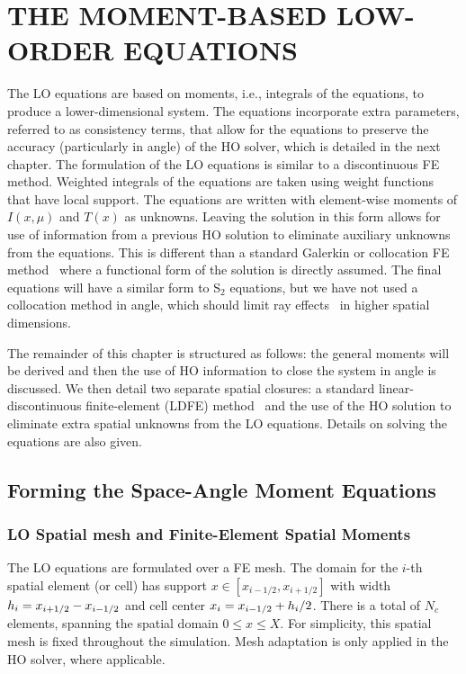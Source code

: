 
\chapter{\uppercase{The Moment-Based Low-Order Equations}}
\label{chp:lo}

The LO equations are based on moments, i.e., integrals of the equations, to produce a
lower-dimensional system.  The equations incorporate extra parameters, referred to as
consistency terms, that allow for the equations to preserve the accuracy (particularly in
angle) of the HO solver, which is detailed in the next chapter. 
The formulation of the LO equations is similar to a discontinuous FE method.  Weighted
integrals of the equations are taken using weight functions that have local support. 
The equations are written with element-wise moments of $I(x,\mu)$ and $T(x)$ as
unknowns.  Leaving the solution in this form allows for use of information from a
previous HO solution to eliminate auxiliary unknowns from the equations. This is different
than a standard Galerkin or collocation FE
method~\cite{fem_book,morel_ldtrt,morel_notes} where a
functional form of the solution is directly assumed. The final equations will have a
similar form to S$_2$ equations, but we have not used a collocation method in angle,
which should limit ray effects~\cite{morel_notes,lewis} in higher spatial dimensions.

The remainder of this chapter is structured as follows: the general moments will be
derived and then the use of HO information to close the system in angle is discussed.
We then detail two separate spatial closures: a standard linear-discontinuous finite-element (LDFE)
method~\cite{morel_ldtrt} and the use of the HO solution to eliminate extra
spatial unknowns from the LO equations.  Details on solving the equations are also given.

\section{Forming the Space-Angle Moment Equations}

\subsection{LO Spatial mesh and Finite-Element Spatial Moments}

The LO equations are formulated over a FE mesh.  The domain for the $i$-th spatial
element (or cell) has support $x\in[x_{i-1/2},x_{i+1/2}]$ with width $h_i=x_{i+1/2} -
x_{{i-1/2}}$ and cell center 
$x_i = x_{{i-1/2}} + h_i/2$.  There is a total of $N_c$ elements, spanning the
spatial domain $0\leq x\leq X$.  For simplicity, this spatial mesh is fixed throughout the
simulation.  Mesh adaptation is only applied in the HO solver, where applicable.

